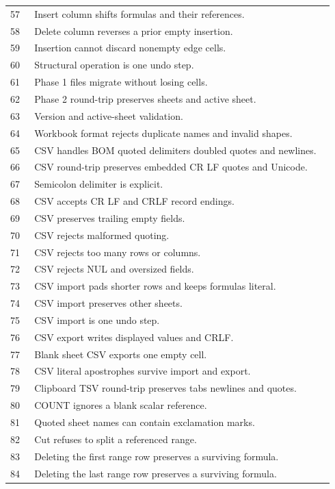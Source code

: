 \documentclass[11pt,letterpaper]{article}
\begin{document}
\begin{longtable}{@{}P{0.07\linewidth}P{0.87\linewidth}@{}}
57 & Insert column shifts formulas and their references.\\
58 & Delete column reverses a prior empty insertion.\\
59 & Insertion cannot discard nonempty edge cells.\\
60 & Structural operation is one undo step.\\
61 & Phase 1 files migrate without losing cells.\\
62 & Phase 2 round-trip preserves sheets and active sheet.\\
63 & Version and active-sheet validation.\\
64 & Workbook format rejects duplicate names and invalid shapes.\\
65 & CSV handles BOM quoted delimiters doubled quotes and newlines.\\
66 & CSV round-trip preserves embedded CR LF quotes and Unicode.\\
67 & Semicolon delimiter is explicit.\\
68 & CSV accepts CR LF and CRLF record endings.\\
69 & CSV preserves trailing empty fields.\\
70 & CSV rejects malformed quoting.\\
71 & CSV rejects too many rows or columns.\\
72 & CSV rejects NUL and oversized fields.\\
73 & CSV import pads shorter rows and keeps formulas literal.\\
74 & CSV import preserves other sheets.\\
75 & CSV import is one undo step.\\
76 & CSV export writes displayed values and CRLF.\\
77 & Blank sheet CSV exports one empty cell.\\
78 & CSV literal apostrophes survive import and export.\\
79 & Clipboard TSV round-trip preserves tabs newlines and quotes.\\
80 & COUNT ignores a blank scalar reference.\\
81 & Quoted sheet names can contain exclamation marks.\\
82 & Cut refuses to split a referenced range.\\
83 & Deleting the first range row preserves a surviving formula.\\
84 & Deleting the last range row preserves a surviving formula.\\

\end{longtable}
\end{document}
